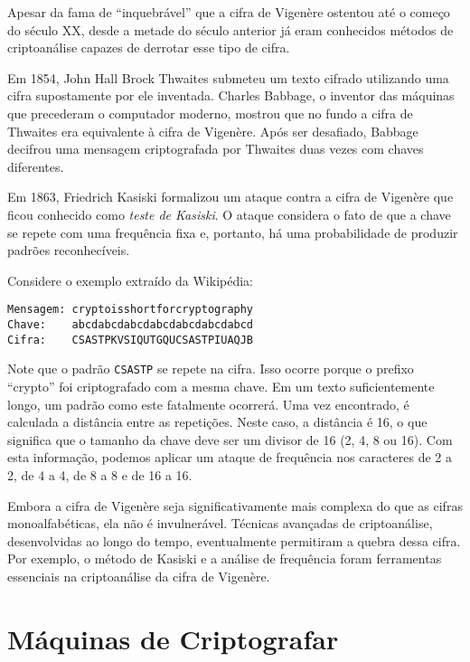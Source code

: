 Apesar da fama de ``inquebrável'' que a cifra de Vigenère ostentou até o começo do século XX, desde a metade do século anterior já eram conhecidos métodos de criptoanálise capazes de derrotar esse tipo de cifra.

Em 1854, John Hall Brock Thwaites submeteu um texto cifrado utilizando uma cifra supostamente por ele inventada.
Charles Babbage, o inventor das máquinas que precederam o computador moderno, mostrou que no fundo a cifra de Thwaites era equivalente à cifra de Vigenère.
Após ser desafiado, Babbage decifrou uma mensagem criptografada por Thwaites duas vezes com chaves diferentes.

Em 1863, Friedrich Kasiski formalizou um ataque contra a cifra de Vigenère que ficou conhecido como {\em teste de Kasiski}.
O ataque considera o fato de que a chave se repete com uma frequência fixa e, portanto, há uma probabilidade de produzir padrões reconhecíveis.

\begin{example}
  Considere o exemplo extraído da Wikipédia:
  
\begin{verbatim}
Mensagem: cryptoisshortforcryptography
Chave:    abcdabcdabcdabcdabcdabcdabcd
Cifra:    CSASTPKVSIQUTGQUCSASTPIUAQJB
\end{verbatim}
\end{example}

Note que o padrão {\tt CSASTP} se repete na cifra.
Isso ocorre porque o prefixo ``crypto'' foi criptografado com a mesma chave.
Em um texto suficientemente longo, um padrão como este fatalmente ocorrerá.
Uma vez encontrado, é calculada a distância entre as repetições.
Neste caso, a distância é 16, o que significa que o tamanho da chave deve ser um divisor de 16 (2, 4, 8 ou 16).
Com esta informação, podemos aplicar um ataque de frequência nos caracteres de 2 a 2, de 4 a 4, de 8 a 8 e de 16 a 16.

Embora a cifra de Vigenère seja significativamente mais complexa do que as cifras monoalfabéticas, ela não é invulnerável.
Técnicas avançadas de criptoanálise, desenvolvidas ao longo do tempo, eventualmente permitiram a quebra dessa cifra.
Por exemplo, o método de Kasiski e a análise de frequência foram ferramentas essenciais na criptoanálise da cifra de Vigenère.

\section{Máquinas de Criptografar}
\label{sec:maquinas}

